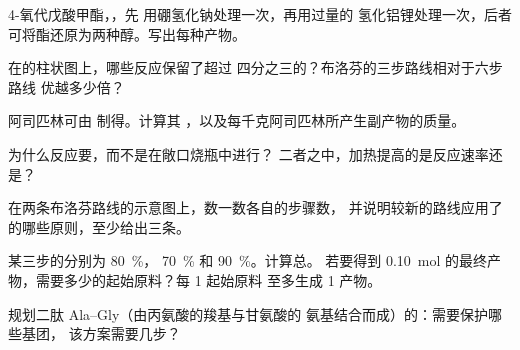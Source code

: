\begin{exercise}[$\star\star$]\label{exo:g12:synthesis-strategy:7}
4-氧代戊酸甲酯，，先
用硼氢化钠处理一次，再用过量的
氢化铝锂处理一次，后者可将酯还原为两种醇。写出每种产物。
\end{exercise}

\begin{exercise}[$\star\star$]\label{exo:g12:synthesis-strategy:8}
在的柱状图上，哪些反应保留了超过
四分之三的？布洛芬的三步路线相对于六步路线
优越多少倍？
\end{exercise}

\begin{exercise}[$\star\star$]\label{exo:g12:synthesis-strategy:9}
阿司匹林可由  制得。计算其
，以及每千克阿司匹林所产生副产物的质量。
\end{exercise}

\begin{exercise}[$\star\star$]\label{exo:g12:synthesis-strategy:10}
为什么反应要，而不是在敞口烧瓶中进行？
二者之中，加热提高的是反应速率还是？
\end{exercise}

\begin{exercise}[$\star\star$]\label{exo:g12:synthesis-strategy:11}
在两条布洛芬路线的示意图上，数一数各自的步骤数，
并说明较新的路线应用了的哪些原则，至少给出三条。
\end{exercise}

\begin{exercise}[$\star\star\star$]\label{exo:g12:synthesis-strategy:12}
某三步的分别为 \qty{80}{\percent}，
\qty{70}{\percent} 和 \qty{90}{\percent}。计算总。
若要得到 \qty{0.10}{mol}
的最终产物，需要多少的起始原料？每 1 起始原料
至多生成 1 产物。
\end{exercise}

\begin{exercise}[$\star\star\star$]\label{exo:g12:synthesis-strategy:13}
规划二肽 Ala--Gly（由丙氨酸的羧基与甘氨酸的
氨基结合而成）的：需要保护哪些基团，
该方案需要几步？
\end{exercise}

